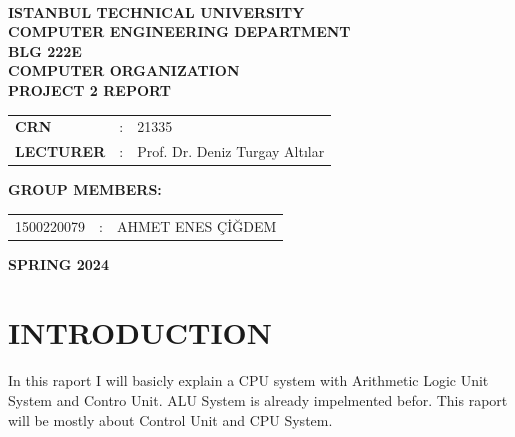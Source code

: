 \documentclass[pdftex,12pt,a4paper]{article}
\begin{document}
	\begin{titlepage}
		\begin{center}
			\textbf{}\\
			\textbf{\Large{ISTANBUL TECHNICAL UNIVERSITY}}\\
			\vspace{0.5cm}
			\textbf{\Large{COMPUTER ENGINEERING DEPARTMENT}}\\
			\vspace{4cm}
			\textbf{\Large{BLG 222E\\ COMPUTER ORGANIZATION\\ PROJECT 2 REPORT}}\\
			\vspace{4cm}
			\begin{table}[ht]
				\centering
				\Large{
					\begin{tabular}{lcl}
						\textbf{CRN}  & : & 21335 \\
						\textbf{LECTURER}  & : & Prof. Dr. Deniz Turgay Altılar \\
				\end{tabular}}
			\end{table}
			\vspace{1cm}
			\textbf{\Large{GROUP MEMBERS:}}\\
			\begin{table}[ht]
				\centering
				\Large{
					\begin{tabular}{rcl}
						1500220079  & : & AHMET ENES ÇİĞDEM \\
				\end{tabular}}
			\end{table}
			\vspace{2.8cm}
			\textbf{\Large{SPRING 2024}}
			
		\end{center}
		
	\end{titlepage}
	
	\thispagestyle{empty}
	\setcounter{tocdepth}{4}
	\tableofcontents
	\clearpage
	
	\setcounter{page}{1}
	
	\section{INTRODUCTION}
	
	In this raport I will basicly explain a CPU system with Arithmetic Logic Unit System and Contro Unit. ALU System is already impelmented befor. This raport will be mostly about Control Unit and CPU System.  
	
\end{document}
